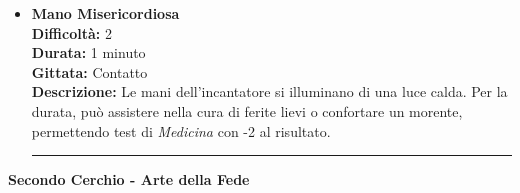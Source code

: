\documentclass[../manuale_main.tex]{subfiles}
\begin{document}
\begin{itemize}
\vspace{0.5cm}\rule{\textwidth}{0.4pt}\vspace{1cm}

\item \textbf{Mano Misericordiosa} \\
\textbf{Difficoltà:} 2 \\
\textbf{Durata:} 1 minuto \\
\textbf{Gittata:} Contatto \\
\textbf{Descrizione:} Le mani dell’incantatore si illuminano di una luce calda. Per la durata, può assistere nella cura di ferite lievi o confortare un morente, permettendo test di \textit{Medicina} con -2 al risultato.


\vspace{0.5cm}\rule{\textwidth}{0.4pt}\vspace{1cm}

\end{itemize}


\clearpage
\vspace{0.2cm}
{\zarafirtitlefont\Large\bfseries Secondo Cerchio - Arte della Fede}
\end{document}
